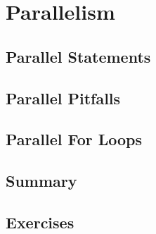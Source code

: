 \chapter{Parallelism}


\section{Parallel Statements}

\section{Parallel Pitfalls}

\section{Parallel For Loops}
\section{Summary}


\section{Exercises}

